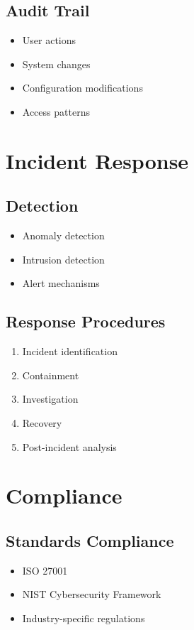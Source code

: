 \documentclass{article}
\begin{document}
\subsection{Audit Trail}
\begin{itemize}
    \item User actions
    \item System changes
    \item Configuration modifications
    \item Access patterns
\end{itemize}

\section{Incident Response}

\subsection{Detection}
\begin{itemize}
    \item Anomaly detection
    \item Intrusion detection
    \item Alert mechanisms
\end{itemize}

\subsection{Response Procedures}
\begin{enumerate}[label=\arabic*.]
    \item Incident identification
    \item Containment
    \item Investigation
    \item Recovery
    \item Post-incident analysis
\end{enumerate}

\section{Compliance}

\subsection{Standards Compliance}
\begin{itemize}
    \item ISO 27001
    \item NIST Cybersecurity Framework
    \item Industry-specific regulations
\end{itemize}
\end{document}
